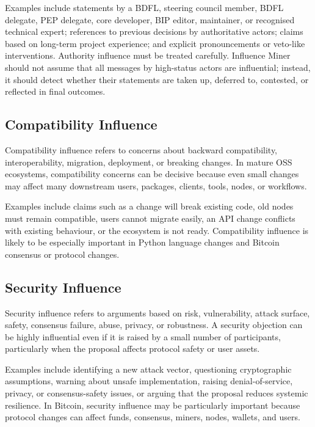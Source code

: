Examples include statements by a BDFL, steering council member, BDFL delegate, PEP delegate, core developer, BIP editor, maintainer, or recognised technical expert; references to previous decisions by authoritative actors; claims based on long-term project experience; and explicit pronouncements or veto-like interventions. Authority influence must be treated carefully. Influence Miner should not assume that all messages by high-status actors are influential; instead, it should detect whether their statements are taken up, deferred to, contested, or reflected in final outcomes.

\subsection{Compatibility Influence}

Compatibility influence refers to concerns about backward compatibility, interoperability, migration, deployment, or breaking changes. In mature OSS ecosystems, compatibility concerns can be decisive because even small changes may affect many downstream users, packages, clients, tools, nodes, or workflows.

Examples include claims such as a change will break existing code, old nodes must remain compatible, users cannot migrate easily, an API change conflicts with existing behaviour, or the ecosystem is not ready. Compatibility influence is likely to be especially important in Python language changes and Bitcoin consensus or protocol changes.

\subsection{Security Influence}

Security influence refers to arguments based on risk, vulnerability, attack surface, safety, consensus failure, abuse, privacy, or robustness. A security objection can be highly influential even if it is raised by a small number of participants, particularly when the proposal affects protocol safety or user assets.

Examples include identifying a new attack vector, questioning cryptographic assumptions, warning about unsafe implementation, raising denial-of-service, privacy, or consensus-safety issues, or arguing that the proposal reduces systemic resilience. In Bitcoin, security influence may be particularly important because protocol changes can affect funds, consensus, miners, nodes, wallets, and users.

